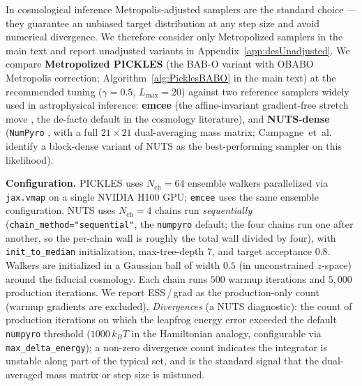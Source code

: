 \documentclass{article}
\begin{document}
In cosmological inference Metropolis-adjusted samplers are the
standard choice — they guarantee an unbiased target distribution at
any step size and avoid numerical divergence. We therefore consider
only Metropolized samplers in the main text and report unadjusted
variants in Appendix~\ref{app:desUnadjusted}. We compare
\textbf{Metropolized PICKLES} (the BAB-O variant with OBABO Metropolis
correction; Algorithm~\ref{alg:PicklesBABO} in the main text) at the
recommended tuning ($\gamma\!=\!0.5$, $L_{\max}\!=\!20$) against two
reference samplers widely used in astrophysical inference:
\textbf{emcee} \cite{foreman2013emcee} (the affine-invariant
gradient-free stretch move \cite{goodman2010ensemble}, the de-facto
default in the cosmology literature), and \textbf{NUTS-dense}
(\texttt{NumPyro} \cite{phan2019composable}, with a full $21\!\times\!21$
dual-averaging mass matrix; Campagne~et~al.\ \cite{campagne2023jax}
identify a block-dense variant of NUTS as the best-performing sampler
on this likelihood).

\textbf{Configuration.} PICKLES uses $N_{\text{ch}}\!=\!64$ ensemble
walkers parallelized via \texttt{jax.vmap} on a single NVIDIA H100
GPU; \texttt{emcee} uses the same ensemble configuration. NUTS uses
$N_{\text{ch}}\!=\!4$ chains run \emph{sequentially}
(\texttt{chain\_method="sequential"}, the \texttt{numpyro} default;
the four chains run one after another, so the per-chain wall is
roughly the total wall divided by four), with \texttt{init\_to\_median}
initialization, max-tree-depth $7$, and target acceptance $0.8$.
Walkers are initialized in a Gaussian ball of width $0.5$ (in
unconstrained $z$-space) around the fiducial cosmology. Each chain
runs $500$ warmup iterations and $5{,}000$ production iterations.
We report ESS\,/\,grad as the production-only count (warmup gradients
are excluded). \emph{Divergences} (a NUTS diagnostic): the count of
production iterations on which the leapfrog energy error exceeded the
default \texttt{numpyro} threshold ($1000\,k_B T$ in the Hamiltonian
analogy, configurable via \texttt{max\_delta\_energy}); a non-zero
divergence count indicates the integrator is unstable along part of
the typical set, and is the standard signal that the dual-averaged
mass matrix or step size is mistuned.
\end{document}
